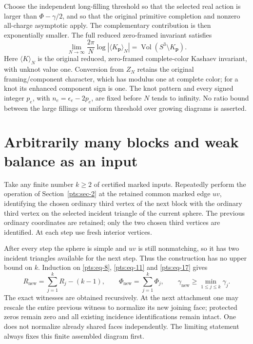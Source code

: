 Choose the independent long-filling threshold so that the selected real
action is larger than \(\Phi-\gamma/2\), and so that the original
primitive completion and nonzero all-charge asymptotic apply. The
complementary contribution is then exponentially smaller. The full
reduced zero-framed invariant satisfies \begin{equation}\label{pts:eq-22}
\boxed{\displaystyle
 \lim_{N\to\infty}\frac{2\pi}{N}
       \log|\langle K_{\boldsymbol p}\rangle_N|
   =\operatorname{Vol}(S^3\setminus K_{\boldsymbol p}).}
\end{equation} Here \(\langle K\rangle_N\) is the original reduced, zero-framed
complete-color Kashaev invariant, with unknot value one. Conversion from
\(Z_N\) retains the original framing/component character, which has
modulus one at complete color; for a knot its enhanced component sign is
one.  The knot pattern and
every signed integer \(p_e\), with \(n_e=\epsilon_e-2p_e\), are fixed
before \(N\) tends to infinity. No ratio bound between the large
fillings or uniform threshold over growing diagrams is asserted.

\section{Arbitrarily many blocks and weak balance as an
input}\label{pts:sec-6}

Take any finite number \(k\ge2\) of certified marked inputs. Repeatedly
perform the operation of Section~\ref{pts:sec-2} at the retained common marked edge
\(uv\), identifying the chosen ordinary third vertex of the next block
with the ordinary third vertex on the selected incident triangle of the
current sphere. The previous ordinary coordinates are retained; only the
two chosen third vertices are identified. At each step use fresh
interior vertices.

After every step the sphere is simple and \(uv\) is still nonmatching,
so it has two incident triangles available for the next step. Thus the
construction has no upper bound on \(k\). Induction on \eqref{pts:eq-8}, \eqref{pts:eq-11} and
\eqref{pts:eq-17} gives \begin{equation}\label{pts:eq-23}
R_{\mathrm{new}}=\sum_{j=1}^kR_j-(k-1),\qquad
 \Phi_{\mathrm{new}}=\sum_{j=1}^k\Phi_j,\qquad
 \gamma_{\mathrm{new}}\ge\min_{1\le j\le k}\gamma_j.
\end{equation} The exact witnesses are obtained recursively. At the next attachment
one may rescale the entire previous witness to normalize its new joining
face; protected zeros remain zero and all existing incidence
identifications remain intact. One does not normalize already shared
faces independently. The limiting statement always fixes this finite
assembled diagram first.

